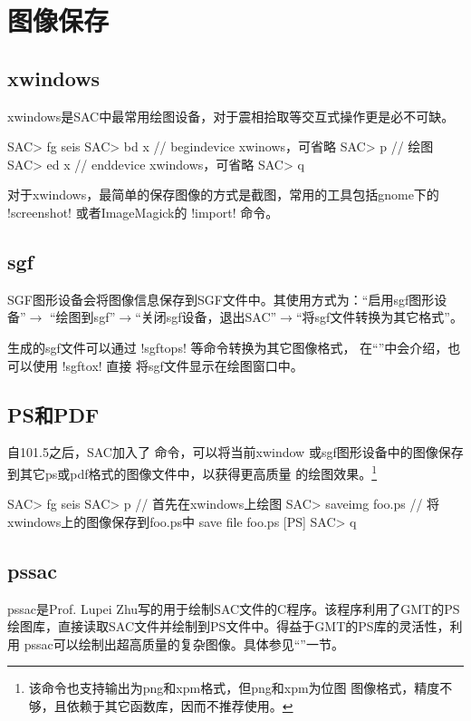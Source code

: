 \section{图像保存}
\label{sec:save-image}

\subsection{xwindows}
xwindows是SAC中最常用绘图设备，对于震相拾取等交互式操作更是必不可缺。
\begin{SACCode}
SAC> fg seis
SAC> bd x       // begindevice xwinows，可省略
SAC> p          // 绘图
SAC> ed x       // enddevice xwindows，可省略
SAC> q
\end{SACCode}

对于xwindows，最简单的保存图像的方式是截图，常用的工具包括gnome下的
!screenshot! 或者ImageMagick的 !import! 命令。

\subsection{sgf}
SGF图形设备会将图像信息保存到SGF文件中。其使用方式为：``启用sgf图形设备''$\rightarrow$
``绘图到sgf''$\rightarrow$``关闭sgf设备，退出SAC''$\rightarrow$``将sgf文件转换为其它格式''。

生成的sgf文件可以通过 !sgftops! 等命令转换为其它图像格式，
在``''中会介绍，也可以使用 !sgftox! 直接
将sgf文件显示在绘图窗口中。

\subsection{PS和PDF}
自101.5之后，SAC加入了  命令，可以将当前xwindow
或sgf图形设备中的图像保存到其它ps或pdf格式的图像文件中，以获得更高质量
的绘图效果。\footnote{该命令也支持输出为png和xpm格式，但png和xpm为位图
图像格式，精度不够，且依赖于其它函数库，因而不推荐使用。}

\begin{SACCode}
SAC> fg seis
SAC> p                      // 首先在xwindows上绘图
SAC> saveimg foo.ps         // 将xwindows上的图像保存到foo.ps中
save file foo.ps [PS]
SAC> q
\end{SACCode}

\subsection{pssac}
pssac是Prof. Lupei Zhu写的用于绘制SAC文件的C程序。该程序利用了GMT的PS
绘图库，直接读取SAC文件并绘制到PS文件中。得益于GMT的PS库的灵活性，利用
pssac可以绘制出超高质量的复杂图像。具体参见``''一节。

